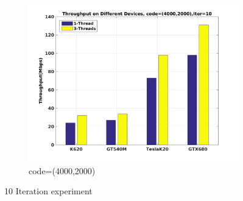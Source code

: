 \documentclass{article}
\begin{document}
\begin{figure}[H]
\begin{subfigure}[b]{0.7\textwidth}
    \includegraphics[width=\textwidth]{c_4k_10.jpg}
    \caption{code=(4000,2000)}
    \label{fig:throu_10_c}
  \end{subfigure}
  \caption{10 Iteration experiment}\label{fig:10iter}
\end{figure}
\end{document}
